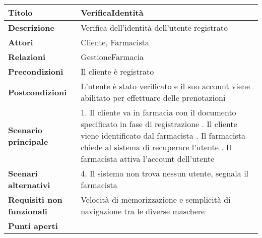 \begin{tabular} {|P{4.5cm}|P{12.5cm}|}
\hline
  \textbf{Titolo} & VerificaIdentità\\
\hline
  \textbf{Descrizione} & Verifica dell'identità dell'utente registrato\\
\hline
  \textbf{Attori} & Cliente, Farmacista\\
\hline
  \textbf{Relazioni} & GestioneFarmacia\\
\hline
  \textbf{Precondizioni} & Il cliente è registrato\\
\hline
  \textbf{Postcondizioni} & L'utente è stato verificato e il suo account viene abilitato per effettuare delle prenotazioni\\
\hline
  \textbf{Scenario principale} & 1. Il cliente va in farmacia con il documento specificato in fase di registrazione . Il cliente viene identificato dal farmacista . Il farmacista chiede al sistema di recuperare l'utente . Il farmacista attiva l'account dell'utente\\
\hline
  \textbf{Scenari alternativi} & 4. Il sistema non trova nessun utente, segnala il farmacista\\
\hline
\textbf{Requisiti non funzionali} & Velocità di memorizzazione e semplicità di navigazione tra le diverse maschere\\
\hline
  \textbf{Punti aperti} &\\
\hline
\end{tabular}
\hfill
\break


